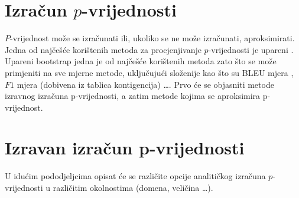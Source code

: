 \section{Izračun $p$-vrijednosti}

$P$-vrijednost može se izračunati ili, ukoliko se ne može izračunati, aproksimirati. Jedna od najčešće korištenih metoda za procjenjivanje $p$-vrijednosti je upareni . Upareni bootstrap jedna je od najčešće korištenih metoda \citep{koehn2004statistical} zato što se može primjeniti na sve mjerne metode, uključujući složenije kao što su BLEU mjera \citep{papineni2002bleu}, $F1$ mjera (dobivena iz tablica kontigencija) \dots. Prvo će se objasniti metode izravnog izračuna p-vrijednosti, a zatim metode kojima se aproksimira p-vrijednost.

\section{Izravan izračun p-vrijednosti}

U idućim pododjeljcima opisat će se različite opcije analitičkog izračuna $p$-vrijednosti u različitim okolnostima (domena, veličina \dots).

